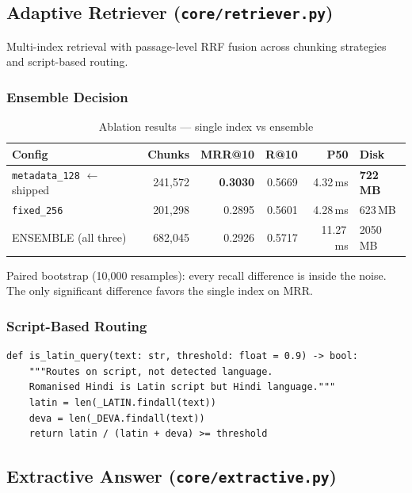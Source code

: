\documentclass[12pt,a4paper]{article}
\begin{document}
\subsection{Adaptive Retriever (\texttt{core/retriever.py})}

Multi-index retrieval with passage-level RRF fusion across chunking strategies and script-based routing.

\subsubsection{Ensemble Decision}

\begin{table}[H]
\centering
\small
\begin{tabular}{lrrrrl}
\toprule
\textbf{Config} & \textbf{Chunks} & \textbf{MRR@10} & \textbf{R@10} & \textbf{P50} & \textbf{Disk} \\
\midrule
\texttt{metadata\_128} $\leftarrow$ shipped & 241,572 & \textbf{0.3030} & 0.5669 & 4.32\,ms & \textbf{722\,MB} \\
\texttt{fixed\_256}           & 201,298 & 0.2895 & 0.5601 & 4.28\,ms & 623\,MB \\
ENSEMBLE (all three)          & 682,045 & 0.2926 & 0.5717 & 11.27\,ms & 2050\,MB \\
\bottomrule
\end{tabular}
\caption{Ablation results --- single index vs ensemble}
\end{table}

Paired bootstrap (10,000 resamples): every recall difference is inside the noise. The only significant difference favors the single index on MRR.

\subsubsection{Script-Based Routing}

\begin{lstlisting}
def is_latin_query(text: str, threshold: float = 0.9) -> bool:
    """Routes on script, not detected language.
    Romanised Hindi is Latin script but Hindi language."""
    latin = len(_LATIN.findall(text))
    deva = len(_DEVA.findall(text))
    return latin / (latin + deva) >= threshold
\end{lstlisting}


\subsection{Extractive Answer (\texttt{core/extractive.py})}
\end{document}
